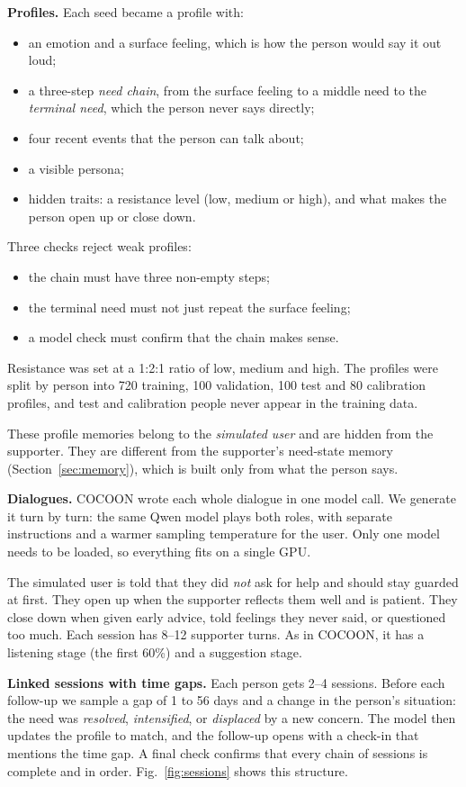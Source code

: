 \documentclass[journal]{IEEEtran}
\begin{document}
\textbf{Profiles.} Each seed became a profile with:
\begin{itemize}
\item an emotion and a surface feeling, which is how the person would say it out loud;
\item a three-step \emph{need chain}, from the surface feeling to a middle need to the \emph{terminal need}, which the person never says directly;
\item four recent events that the person can talk about;
\item a visible persona;
\item hidden traits: a resistance level (low, medium or high), and what makes the person open up or close down.
\end{itemize}
Three checks reject weak profiles:
\begin{itemize}
\item the chain must have three non-empty steps;
\item the terminal need must not just repeat the surface feeling;
\item a model check must confirm that the chain makes sense.
\end{itemize}
Resistance was set at a 1:2:1 ratio of low, medium and high. The profiles were split by person into 720 training, 100 validation, 100 test and 80 calibration profiles, and test and calibration people never appear in the training data.

These profile memories belong to the \emph{simulated user} and are hidden from the supporter. They are different from the supporter's need-state memory (Section~\ref{sec:memory}), which is built only from what the person says.

\textbf{Dialogues.} COCOON wrote each whole dialogue in one model call. We generate it turn by turn: the same Qwen model plays both roles, with separate instructions and a warmer sampling temperature for the user. Only one model needs to be loaded, so everything fits on a single GPU.

The simulated user is told that they did \emph{not} ask for help and should stay guarded at first. They open up when the supporter reflects them well and is patient. They close down when given early advice, told feelings they never said, or questioned too much. Each session has 8--12 supporter turns. As in COCOON, it has a listening stage (the first 60\%) and a suggestion stage.

\textbf{Linked sessions with time gaps.} Each person gets 2--4 sessions. Before each follow-up we sample a gap of 1 to 56 days and a change in the person's situation: the need was \emph{resolved}, \emph{intensified}, or \emph{displaced} by a new concern. The model then updates the profile to match, and the follow-up opens with a check-in that mentions the time gap. A final check confirms that every chain of sessions is complete and in order. Fig.~\ref{fig:sessions} shows this structure.
\end{document}
